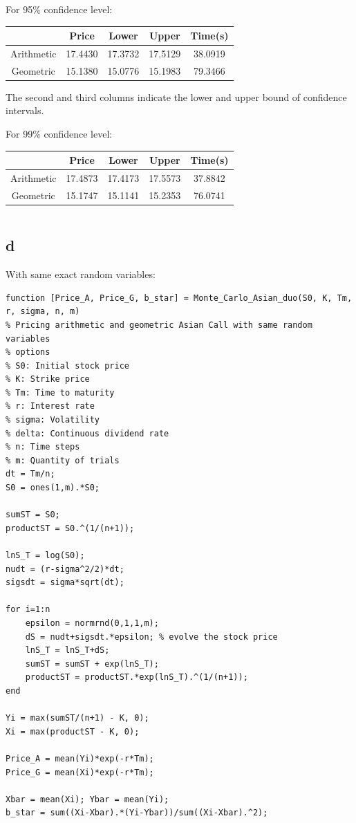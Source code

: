 \documentclass{article}
\begin{document}
For 95\% confidence level:
\begin{table}[h]
\begin{tabular}{|c|c|c|c|c|}

\hline
& Price & Lower & Upper & Time(s) \\
\hline
Arithmetic & 17.4430 & 17.3732 & 17.5129 & 38.0919 \\
\hline
Geometric & 15.1380 & 15.0776 & 15.1983 & 79.3466 \\
\hline

\end{tabular}
\end{table}
The second and third columns indicate the lower and upper bound of confidence intervals.

For 99\% confidence level:

\begin{table}[h]
\begin{tabular}{|c|c|c|c|c|}

\hline
& Price & Lower & Upper & Time(s) \\
\hline
Arithmetic & 17.4873 & 17.4173 & 17.5573 & 37.8842 \\
\hline
Geometric & 15.1747 & 15.1141 & 15.2353 & 76.0741 \\
\hline

\end{tabular}
\end{table}


\begin{verbatim}

\end{verbatim}

\subsection{d}
With same exact random variables:
\begin{verbatim}
function [Price_A, Price_G, b_star] = Monte_Carlo_Asian_duo(S0, K, Tm, r, sigma, n, m)
% Pricing arithmetic and geometric Asian Call with same random variables
% options
% S0: Initial stock price
% K: Strike price
% Tm: Time to maturity
% r: Interest rate
% sigma: Volatility
% delta: Continuous dividend rate
% n: Time steps
% m: Quantity of trials
dt = Tm/n;
S0 = ones(1,m).*S0;

sumST = S0;
productST = S0.^(1/(n+1));

lnS_T = log(S0);
nudt = (r-sigma^2/2)*dt;
sigsdt = sigma*sqrt(dt);

for i=1:n
    epsilon = normrnd(0,1,1,m);
    dS = nudt+sigsdt.*epsilon; % evolve the stock price
    lnS_T = lnS_T+dS;
    sumST = sumST + exp(lnS_T);
    productST = productST.*exp(lnS_T).^(1/(n+1));
end

Yi = max(sumST/(n+1) - K, 0);
Xi = max(productST - K, 0);

Price_A = mean(Yi)*exp(-r*Tm);
Price_G = mean(Xi)*exp(-r*Tm);

Xbar = mean(Xi); Ybar = mean(Yi);
b_star = sum((Xi-Xbar).*(Yi-Ybar))/sum((Xi-Xbar).^2);
\end{verbatim}
\end{document}
